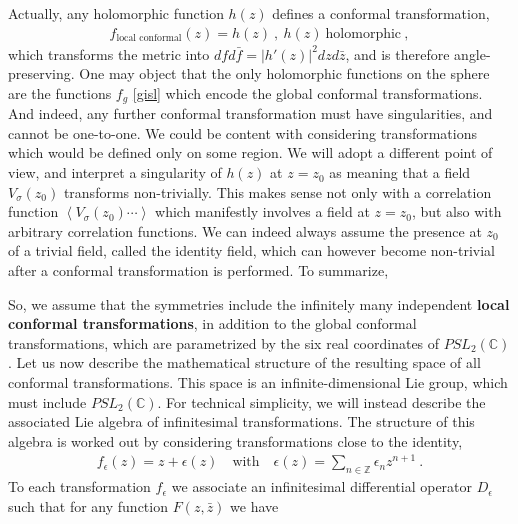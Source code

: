 \documentclass[12pt, a4paper, notitlepage, twoside]{report}
\numberwithin{equation}{section}
\theoremstyle{break}
\begin{document}
Actually, any holomorphic function $h(z)$ defines a conformal transformation,
\begin{align}
 f_\text{local conformal}(z) = h(z) \ , \ h(z)\ \text{holomorphic}\ , 
\label{flc}
\end{align}
which transforms the metric into $dfd\bar{f} = |h'(z)|^2 dzd\bar{z}$, and is therefore angle-preserving.
One may object that the only holomorphic functions on the sphere are the functions $f_g$ \eqref{gisl} which encode the global conformal transformations.
And indeed, any further conformal transformation must have singularities, and cannot be one-to-one.
We could be content with considering transformations which would be defined only on some region.
We will adopt a different point of view, and interpret a singularity of $h(z)$ at $z=z_0$ as meaning that a field $V_\sigma(z_0)$ transforms non-trivially.
This makes sense not only with a correlation function $\left\langle V_{\sigma}(z_0)\cdots \right\rangle $ which manifestly involves a field at $z=z_0$, 
but also with arbitrary correlation functions.
We can indeed always assume the presence at $z_0$ of a trivial field, called the identity field, which can however become non-trivial after a conformal transformation is performed.
To summarize,
\begin{center}
\end{center}
So, we assume that the symmetries include the infinitely many independent \textbf{\boldmath local conformal transformations}, in addition to the global conformal transformations, which are parametrized by the six real coordinates of $PSL_2({\mathbb{C}})$.
Let us now describe the mathematical structure of the resulting space of all conformal transformations.
This space is an infinite-dimensional Lie group, which must include $PSL_2({\mathbb{C}})$.
For technical simplicity, we will instead describe the associated Lie algebra of infinitesimal transformations.
The structure of this algebra is worked out by considering transformations close to the identity, 
\begin{align}
 f_{\epsilon}(z) = z + \epsilon(z) \quad \text{with} \quad \epsilon(z) = \sum_{n\in{\mathbb{Z}}} \epsilon_n z^{n+1}\ .
\label{sen}
\end{align}
To each transformation $f_\epsilon$ we associate an infinitesimal differential operator $D_\epsilon$ such that for any function $F(z,\bar{z})$ we have 
\end{document}
